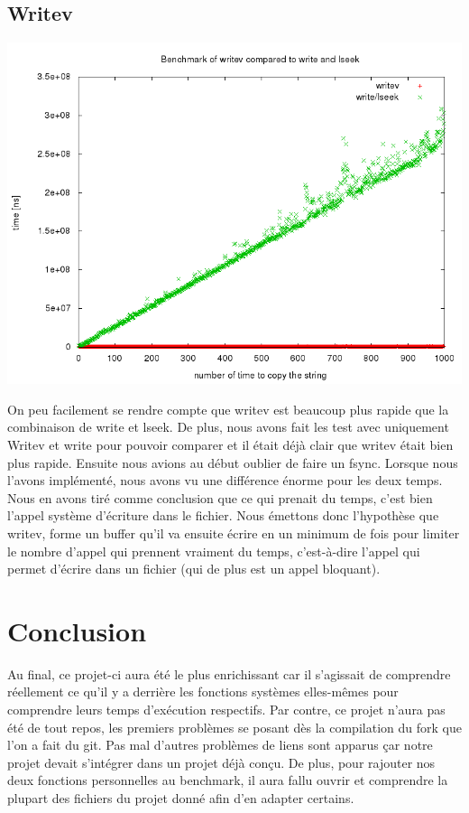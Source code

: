 \documentclass[11pt, oneside]{article}
\begin{document}
\begin{multicols}{2}
\subsection{Writev}

\begin{center}

\includegraphics[scale=0.2]{writev.png}

\end{center}
On peu facilement se rendre compte que writev est beaucoup plus rapide que la combinaison de write et lseek. De plus, nous avons fait les test avec uniquement Writev et write pour pouvoir comparer et il était déjà clair que writev était bien plus rapide. Ensuite nous avions au début oublier de faire un fsync. Lorsque nous l'avons implémenté, nous avons vu une différence énorme pour les deux temps. Nous en avons tiré comme conclusion que ce qui prenait du temps, c'est bien l'appel système d'écriture dans le fichier. Nous émettons donc l'hypothèse que writev, forme un buffer qu'il va ensuite écrire en un minimum de fois pour limiter le nombre d'appel qui prennent vraiment du temps, c'est-à-dire l'appel qui permet d'écrire dans un fichier (qui de plus est un appel bloquant).


\section{Conclusion}
Au final, ce projet-ci aura été le plus enrichissant car il s'agissait de comprendre réellement ce qu'il y a derrière les fonctions systèmes elles-mêmes pour comprendre leurs temps d'exécution respectifs. Par contre, ce projet n'aura pas été de tout repos, les premiers problèmes se posant dès la compilation du fork que l'on a fait du git. Pas mal d'autres problèmes de liens sont apparus çar notre projet devait s'intégrer dans un projet déjà conçu. De plus, pour rajouter nos deux fonctions personnelles au benchmark, il aura fallu ouvrir et comprendre la plupart des fichiers du projet donné afin d'en adapter certains. 
\end{multicols}
\end{document}
